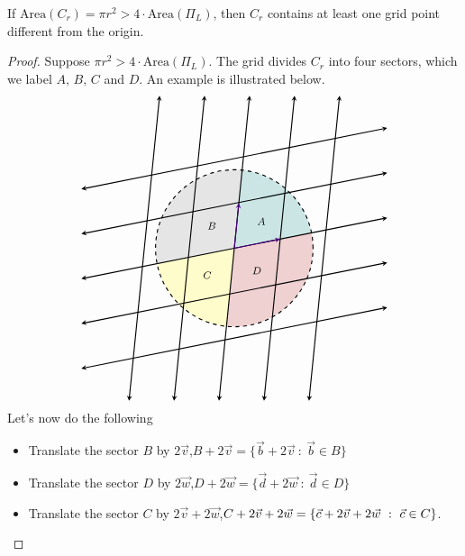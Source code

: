 \begin{theorem}[Minkwoski]\label{mink}
If $\mathrm{Area}(C_r) = \pi r^2 > 4\cdot\mathrm{Area}(\Pi_L)$, then $C_r$ contains at least one grid point different from the origin.
\end{theorem}
\begin{proof}
Suppose $\pi r^2 > 4\cdot\mathrm{Area}(\Pi_L)$. The grid divides $C_r$ into four sectors, which we label $A,\,B,\,C$ and $D$. An example is illustrated below.
\[\begin{tikzpicture}[scale=2.5]
    \fill[teal, fill opacity=1/5] (0,0) -- +(84.3:0.875) arc (84.3:11.31:0.875);
    \fill[firebrick, fill opacity=1/5] (0,0) -- +(11.31:0.875) arc (11.31:-95.7:0.875);
    \fill[yellow, fill opacity=1/5] (0,0) -- +(-95.7:0.875) arc (-95.7:-168.69:0.875);
    \fill[gray, fill opacity=1/5] (0,0) -- +(-168.69:0.875) arc (-168.69:-275.7:0.875);
    \draw[<->,thick,>=stealth] (0.83,-1.7)--(1.17,1.7);
    \draw[<->,thick,>=stealth] (0.33,-1.7)--(0.67,1.7);
    \draw[<->,thick,>=stealth] (-0.17,-1.7)--(0.17,1.7);
    \draw[<->,thick,>=stealth] (-0.67,-1.7)--(-0.33,1.7);
    \draw[<->,thick,>=stealth] (-1.17,-1.7)--(-0.83,1.7);
    \draw[<->,thick,>=stealth] (-1.7,0.66)--(1.7,1.34);
    \draw[<->,thick,>=stealth] (-1.7,0.16)--(1.7,0.84);
    \draw[<->,thick,>=stealth] (-1.7,-0.34)--(1.7,0.34);
    \draw[<->,thick,>=stealth] (-1.7,-0.84)--(1.7,-0.16);
    \draw[<->,thick,>=stealth] (-1.7,-1.34)--(1.7,-0.66);
    \draw[->,thick,>=stealth,color=indigo] (0,0)--(0.0503,0.5025);
    \draw[->,thick,>=stealth,color=indigo] (0,0)--(0.5102,0.102);
    \draw[thick,dashed](0,0) circle (0.875);%
	\node[] at (0.3,0.3) {\footnotesize$A$};
    \node[] at (-0.25,0.25) {\footnotesize $B$};
    \node[] at (-0.3,-0.3) {\footnotesize $C$};
    \node[] at (0.25,-0.25) {\footnotesize $D$};
\end{tikzpicture}\]
Let's now do the following
\begin{itemize}
\item Translate the sector $B$ by $2\vec{v}$,\quad $B + 2\vec{v} = \{\vec{b} + 2\vec{v}\ :\ \vec{b}\in B\}$
\item Translate the sector $D$ by $2\vec{w}$,\quad $D + 2\vec{w} = \{\vec{d} + 2\vec{w}\ :\ \vec{d}\in D\}$
\item Translate the sector $C$ by $2\vec{v} + 2\vec{w}$,\quad $C + 2\vec{v} + 2\vec{w} = \left\{\vec{c} + 2\vec{v} + 2\vec{w}\ :\ \vec{c}\in C\right\}$.

\end{itemize}
\end{proof}
